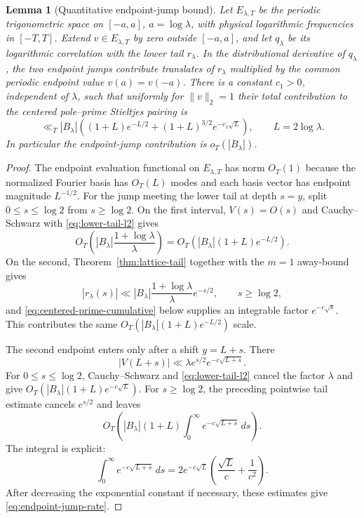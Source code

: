 \documentclass[11pt]{article}
\newtheorem{lemma}[theorem]{Lemma}
\theoremstyle{remark}
\begin{document}
\begin{lemma}[Quantitative endpoint-jump bound]\label{lem:endpoint-jumps}
Let $E_{\lambda,T}$ be the periodic trigonometric space on $[-a,a]$, $a=\log\lambda$, with physical logarithmic frequencies in $[-T,T]$.  Extend $v\in E_{\lambda,T}$ by zero outside $[-a,a]$, and let $q_\lambda$ be its logarithmic correlation with the lower tail $r_\lambda$.  In the distributional derivative of $q_\lambda$, the two endpoint jumps contribute translates of $r_\lambda$ multiplied by the common periodic endpoint value $v(a)=v(-a)$.  There is a constant $c_1>0$, independent of $\lambda$, such that uniformly for $\|v\|_2=1$ their total contribution to the centered pole--prime Stieltjes pairing is
\begin{equation}\label{eq:endpoint-jump-rate}
 \ll_T |B_\lambda|\left((1+L)e^{-L/2}
 +(1+L)^{3/2}e^{-c_1\sqrt L}\right),
 \qquad L=2\log\lambda.
\end{equation}
In particular the endpoint-jump contribution is $o_T(|B_\lambda|)$.
\end{lemma}
\begin{proof}
The endpoint evaluation functional on $E_{\lambda,T}$ has norm $O_T(1)$ because the normalized Fourier basis has $O_T(L)$ modes and each basis vector has endpoint magnitude $L^{-1/2}$.  For the jump meeting the lower tail at depth $s=y$, split $0\le s\le\log2$ from $s\ge\log2$.  On the first interval, $V(s)=O(s)$ and Cauchy--Schwarz with \eqref{eq:lower-tail-l2} gives
\[
 O_T\!\left(|B_\lambda|\frac{1+\log\lambda}{\lambda}\right)
 =O_T\!\left(|B_\lambda|(1+L)e^{-L/2}\right).
\]
On the second, Theorem~\ref{thm:lattice-tail} together with the $m=1$ away-bound gives
\[
 |r_\lambda(s)|\ll |B_\lambda|\frac{1+\log\lambda}{\lambda}e^{-s/2},
 \qquad s\ge\log2,
\]
and \eqref{eq:centered-prime-cumulative} below supplies an integrable factor $e^{-c\sqrt s}$.  This contributes the same $O_T(|B_\lambda|(1+L)e^{-L/2})$ scale.

The second endpoint enters only after a shift $y=L+s$.  There
\[
 |V(L+s)|\ll \lambda e^{s/2}e^{-c\sqrt{L+s}}.
\]
For $0\le s\le\log2$, Cauchy--Schwarz and \eqref{eq:lower-tail-l2} cancel the factor $\lambda$ and give
$O_T(|B_\lambda|(1+L)e^{-c\sqrt L})$.  For $s\ge\log2$, the preceding pointwise tail estimate cancels $e^{s/2}$ and leaves
\[
 O_T\!\left(|B_\lambda|(1+L)
 \int_0^\infty e^{-c\sqrt{L+s}}\,ds\right).
\]
The integral is explicit:
\[
 \int_0^\infty e^{-c\sqrt{L+s}}\,ds
 =2e^{-c\sqrt L}\left(\frac{\sqrt L}{c}+\frac1{c^2}\right).
\]
After decreasing the exponential constant if necessary, these estimates give \eqref{eq:endpoint-jump-rate}.
\end{proof}
\end{document}
